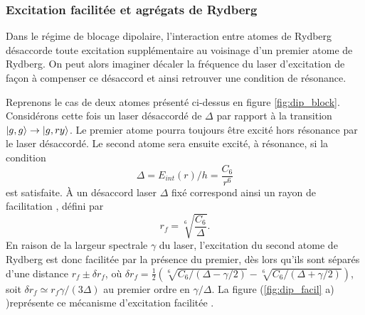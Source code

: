 	\subsubsection*{Excitation facilitée et agrégats de Rydberg}
	
\noindent Dans le régime de blocage dipolaire, l'interaction entre atomes de Rydberg désaccorde toute excitation supplémentaire au voisinage d'un premier atome de Rydberg.
On peut alors imaginer décaler la fréquence du laser d'excitation de façon à compenser ce désaccord et ainsi retrouver une condition de résonance.

Reprenons le cas de deux atomes présenté ci-dessus en figure \eqref{fig:dip_block}.
Considérons cette fois un laser désaccordé de $\Delta$ par rapport à la transition $\ket{g,g} \rightarrow \ket{g,ry}$.
Le premier atome pourra toujours être excité hors résonance par le laser désaccordé.
Le second atome sera ensuite excité, à résonance, si la condition
\begin{equation}
\label{eq:condition_facil}
\Delta = E_{int}(r)/h = \frac{C_6}{r^6}
\end{equation}
est satisfaite.
\`A un désaccord laser $\Delta$ fixé correspond ainsi un \og rayon de facilitation \fg{}, défini par
\begin{equation}
\label{eq:r_facil}
r_f = \sqrt[6]{\frac{C_6}{\Delta}}.
\end{equation}
En raison de la largeur spectrale $\gamma$ du laser, l'excitation du second atome de Rydberg est donc \og facilitée \fg{} par la présence du premier, dès lors qu'ils sont séparés d'une distance $r_f \pm \delta r_f$,
où $\delta r_f = \frac{1}{2} \left( \sqrt[6]{C_6/(\Delta-\gamma/2)} - \sqrt[6]{C_6/(\Delta+\gamma/2)} \right)$, soit $\delta r_f \simeq r_f \gamma / (3\Delta)$ au premier ordre en $\gamma / \Delta$.
La figure (\ref{fig:dip_facil} a) )représente ce mécanisme d'\og excitation facilitée \fg{} .
%	
